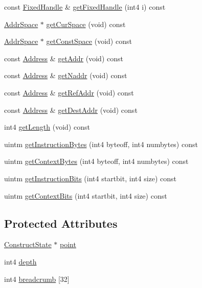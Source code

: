\begin{DoxyCompactItemize}
\item 
const \mbox{\hyperlink{struct_fixed_handle}{Fixed\+Handle}} \& \mbox{\hyperlink{class_parser_walker_af3212cb092a2501f0a16bf4ef9618cdb}{get\+Fixed\+Handle}} (int4 i) const
\item 
\mbox{\hyperlink{class_addr_space}{Addr\+Space}} $\ast$ \mbox{\hyperlink{class_parser_walker_a6af3a4ebd3a69f52ebcae2dd197ffd11}{get\+Cur\+Space}} (void) const
\item 
\mbox{\hyperlink{class_addr_space}{Addr\+Space}} $\ast$ \mbox{\hyperlink{class_parser_walker_ab353bd7e91219577f2d9aff400e84c80}{get\+Const\+Space}} (void) const
\item 
const \mbox{\hyperlink{class_address}{Address}} \& \mbox{\hyperlink{class_parser_walker_a3a5e36992af804c2ece1febb3d0e6691}{get\+Addr}} (void) const
\item 
const \mbox{\hyperlink{class_address}{Address}} \& \mbox{\hyperlink{class_parser_walker_a32fdda0fe14a36c08a4740550e40c0ea}{get\+Naddr}} (void) const
\item 
const \mbox{\hyperlink{class_address}{Address}} \& \mbox{\hyperlink{class_parser_walker_a0ddbb5961570e22d45fe72d33d86ffe6}{get\+Ref\+Addr}} (void) const
\item 
const \mbox{\hyperlink{class_address}{Address}} \& \mbox{\hyperlink{class_parser_walker_a8593ab995c8656e789b3b6aa933a4147}{get\+Dest\+Addr}} (void) const
\item 
int4 \mbox{\hyperlink{class_parser_walker_a77de14662fd97ff54b79b510dcdd7f1d}{get\+Length}} (void) const
\item 
uintm \mbox{\hyperlink{class_parser_walker_ad986695377d62eeb98db856c34db6aa7}{get\+Instruction\+Bytes}} (int4 byteoff, int4 numbytes) const
\item 
uintm \mbox{\hyperlink{class_parser_walker_a630fe457e1473666fcad37cbba63b9a5}{get\+Context\+Bytes}} (int4 byteoff, int4 numbytes) const
\item 
uintm \mbox{\hyperlink{class_parser_walker_af78d60807ac439bf2af102516f257cc8}{get\+Instruction\+Bits}} (int4 startbit, int4 size) const
\item 
uintm \mbox{\hyperlink{class_parser_walker_ae38ea0339696eeeec219b3d36d35e5ac}{get\+Context\+Bits}} (int4 startbit, int4 size) const
\end{DoxyCompactItemize}
\subsection*{Protected Attributes}
\begin{DoxyCompactItemize}
\item 
\mbox{\hyperlink{struct_construct_state}{Construct\+State}} $\ast$ \mbox{\hyperlink{class_parser_walker_a78afa504d43d46dfc72b5796222e518c}{point}}
\item 
int4 \mbox{\hyperlink{class_parser_walker_a13ed53797769d934b958c01005401847}{depth}}
\item 
int4 \mbox{\hyperlink{class_parser_walker_acbc73bc7057a259a7e605f2075291fdf}{breadcrumb}} \mbox{[}32\mbox{]}
\end{DoxyCompactItemize}


